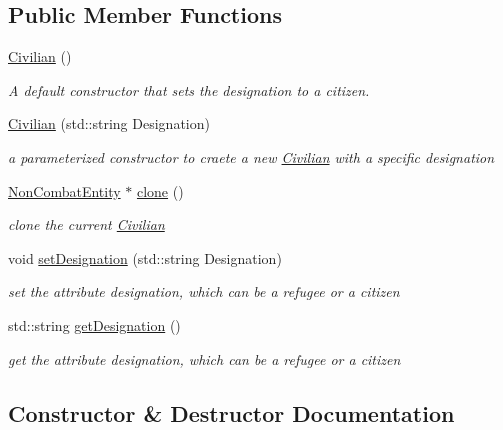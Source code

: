 \subsection*{Public Member Functions}
\begin{DoxyCompactItemize}
\item 
\mbox{\hyperlink{class_civilian_a777f57f7c1a7b1213a665594e902abed}{Civilian}} ()
\begin{DoxyCompactList}\small\item\em A default constructor that sets the designation to a citizen. \end{DoxyCompactList}\item 
\mbox{\hyperlink{class_civilian_a783dc80702e3cd2c1254fa44be08fdee}{Civilian}} (std\+::string Designation)
\begin{DoxyCompactList}\small\item\em a parameterized constructor to craete a new \mbox{\hyperlink{class_civilian}{Civilian}} with a specific designation \end{DoxyCompactList}\item 
\mbox{\hyperlink{class_non_combat_entity}{Non\+Combat\+Entity}} $\ast$ \mbox{\hyperlink{class_civilian_a5c7b7c3b4832ba0d6509e8b87fac87e1}{clone}} ()
\begin{DoxyCompactList}\small\item\em clone the current \mbox{\hyperlink{class_civilian}{Civilian}} \end{DoxyCompactList}\item 
void \mbox{\hyperlink{class_civilian_a8a1a50e95c21a3badd8dfa3ea9945246}{set\+Designation}} (std\+::string Designation)
\begin{DoxyCompactList}\small\item\em set the attribute designation, which can be a refugee or a citizen \end{DoxyCompactList}\item 
std\+::string \mbox{\hyperlink{class_civilian_a416c38216315bd058dffbfb5b33d2795}{get\+Designation}} ()
\begin{DoxyCompactList}\small\item\em get the attribute designation, which can be a refugee or a citizen \end{DoxyCompactList}\end{DoxyCompactItemize}


\subsection{Constructor \& Destructor Documentation}
\mbox{\label{class_civilian_a777f57f7c1a7b1213a665594e902abed}} 
